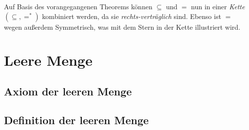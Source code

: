 \documentclass[main.tex]{subfiles}
\begin{document}
\begin{tabproof}
\end{tabproof}

\begin{remark}
Auf Basis des vorangegangenen Theorems können \(\subseteq\) und \(=\) nun in einer \emph{Kette} \((\subseteq,=^{*})\) kombiniert werden,  da sie \emph{rechts-verträglich} sind. Ebenso ist \(=\) wegen  außerdem Symmetrisch, was mit dem Stern in der Kette illustriert wird.
\end{remark}



\chapter{Leere Menge}
\section{Axiom der leeren Menge}


\section{Definition der leeren Menge}
\end{document}
